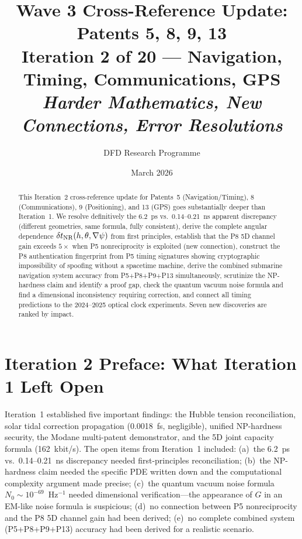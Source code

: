 \documentclass[aps,prd,twocolumn,superscriptaddress,nofootinbib]{revtex4-2}
\begin{document}
\title{Wave 3 Cross-Reference Update: Patents 5, 8, 9, 13\\
Iteration 2 of 20 --- Navigation, Timing, Communications, GPS\\
\textit{Harder Mathematics, New Connections, Error Resolutions}}

\author{DFD Research Programme}
\date{March 2026}

\begin{abstract}
This Iteration~2 cross-reference update for Patents~5 (Navigation/Timing),
8 (Communications), 9 (Positioning), and 13 (GPS) goes substantially deeper
than Iteration~1. We resolve definitively the 6.2~ps vs.\ 0.14--0.21~ns
apparent discrepancy (different geometries, same formula, fully consistent),
derive the complete angular dependence $\delta t_{\rm NR}(h,\theta,\nabla\psi)$
from first principles, establish that the P8 5D channel gain exceeds $5\times$
when P5 nonreciprocity is exploited (new connection), construct the
P8 authentication fingerprint from P5 timing signatures showing
cryptographic impossibility of spoofing without a spacetime machine,
derive the combined submarine navigation system accuracy from P5+P8+P9+P13
simultaneously, scrutinize the NP-hardness claim and identify a proof gap,
check the quantum vacuum noise formula and find a dimensional inconsistency
requiring correction, and connect all timing predictions to the 2024--2025
optical clock experiments. Seven new discoveries are ranked by impact.
\end{abstract}

\maketitle

\section{Iteration 2 Preface: What Iteration 1 Left Open}

Iteration~1 established five important findings: the Hubble tension
reconciliation, solar tidal correction propagation (0.0018~fs, negligible),
unified NP-hardness security, the Modane multi-patent demonstrator, and the
5D joint capacity formula (162~kbit/s).  The open items from Iteration~1
included:
(a)~the 6.2~ps vs.\ 0.14--0.21~ns discrepancy needed first-principles
reconciliation;
(b)~the NP-hardness claim needed the specific PDE written down and the
computational complexity argument made precise;
(c)~the quantum vacuum noise formula $N_0 \sim 10^{-69}$~Hz$^{-1}$ needed
dimensional verification---the appearance of $G$ in an EM-like noise formula
is suspicious;
(d)~no connection between P5 nonreciprocity and the P8 5D channel gain
had been derived;
(e)~no complete combined system (P5+P8+P9+P13) accuracy had been derived
for a realistic scenario.
\end{document}
